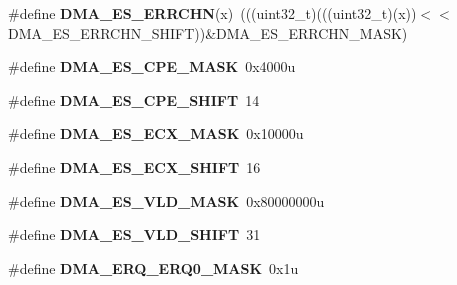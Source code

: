 \begin{DoxyCompactItemize}
\item 
\#define {\bfseries D\+M\+A\+\_\+\+E\+S\+\_\+\+E\+R\+R\+C\+HN}(x)~(((uint32\+\_\+t)(((uint32\+\_\+t)(x))$<$$<$D\+M\+A\+\_\+\+E\+S\+\_\+\+E\+R\+R\+C\+H\+N\+\_\+\+S\+H\+I\+FT))\&D\+M\+A\+\_\+\+E\+S\+\_\+\+E\+R\+R\+C\+H\+N\+\_\+\+M\+A\+SK)\hypertarget{group__DMA__Register__Masks_ga8110274a770ce169f7f5f3136b55431a}{}\label{group__DMA__Register__Masks_ga8110274a770ce169f7f5f3136b55431a}

\item 
\#define {\bfseries D\+M\+A\+\_\+\+E\+S\+\_\+\+C\+P\+E\+\_\+\+M\+A\+SK}~0x4000u\hypertarget{group__DMA__Register__Masks_ga49f6b77458101e61786c204ff60998cb}{}\label{group__DMA__Register__Masks_ga49f6b77458101e61786c204ff60998cb}

\item 
\#define {\bfseries D\+M\+A\+\_\+\+E\+S\+\_\+\+C\+P\+E\+\_\+\+S\+H\+I\+FT}~14\hypertarget{group__DMA__Register__Masks_ga58313d5021ff6e2f0c8a55652c10316b}{}\label{group__DMA__Register__Masks_ga58313d5021ff6e2f0c8a55652c10316b}

\item 
\#define {\bfseries D\+M\+A\+\_\+\+E\+S\+\_\+\+E\+C\+X\+\_\+\+M\+A\+SK}~0x10000u\hypertarget{group__DMA__Register__Masks_ga0781c93c4ce1aa7e73719e9679b6de77}{}\label{group__DMA__Register__Masks_ga0781c93c4ce1aa7e73719e9679b6de77}

\item 
\#define {\bfseries D\+M\+A\+\_\+\+E\+S\+\_\+\+E\+C\+X\+\_\+\+S\+H\+I\+FT}~16\hypertarget{group__DMA__Register__Masks_ga008fd21305ccc358efafd3c27e03c809}{}\label{group__DMA__Register__Masks_ga008fd21305ccc358efafd3c27e03c809}

\item 
\#define {\bfseries D\+M\+A\+\_\+\+E\+S\+\_\+\+V\+L\+D\+\_\+\+M\+A\+SK}~0x80000000u\hypertarget{group__DMA__Register__Masks_ga01506c3abe9cad680a827d4157d09c75}{}\label{group__DMA__Register__Masks_ga01506c3abe9cad680a827d4157d09c75}

\item 
\#define {\bfseries D\+M\+A\+\_\+\+E\+S\+\_\+\+V\+L\+D\+\_\+\+S\+H\+I\+FT}~31\hypertarget{group__DMA__Register__Masks_gaa1e0a184778d19c1c48cc52f941b0d2c}{}\label{group__DMA__Register__Masks_gaa1e0a184778d19c1c48cc52f941b0d2c}

\item 
\#define {\bfseries D\+M\+A\+\_\+\+E\+R\+Q\+\_\+\+E\+R\+Q0\+\_\+\+M\+A\+SK}~0x1u\hypertarget{group__DMA__Register__Masks_ga0be17ff8fd5c65b049c533d5606d2231}{}\label{group__DMA__Register__Masks_ga0be17ff8fd5c65b049c533d5606d2231}


\end{DoxyCompactItemize}
